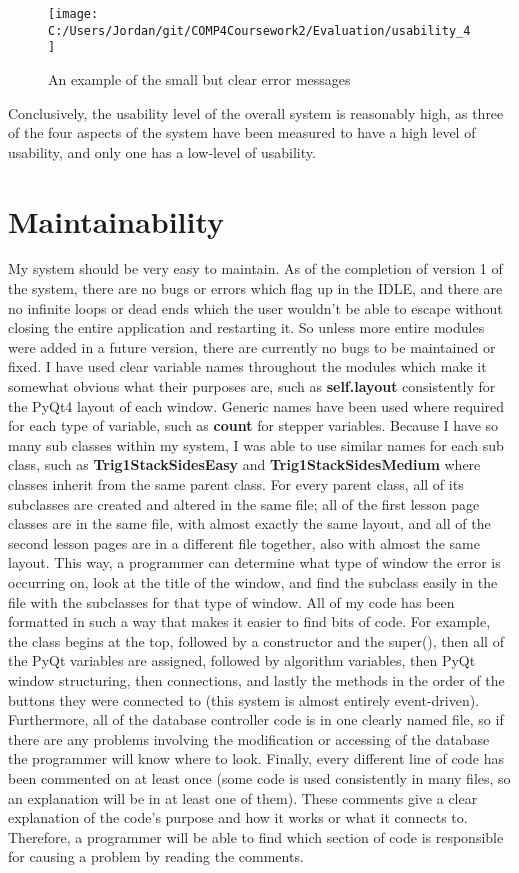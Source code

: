 \begin{figure}[H]
	\texttt{[image: C:/Users/Jordan/git/COMP4Coursework2/Evaluation/usability\_4]}
	\caption{An example of the small but clear error messages}
\end{figure}

Conclusively, the usability level of the overall system is reasonably high, as three of the four aspects of the system have been measured to have a high level of usability, and only one has a low-level of usability.

\section{Maintainability}

My system should be very easy to maintain. As of the completion of version 1 of the system, there are no bugs or errors which flag up in the IDLE, and there are no infinite loops or dead ends which the user wouldn't be able to escape without closing the entire application and restarting it. So unless more entire modules were added in a future version, there are currently no bugs to be maintained or fixed. I have used clear variable names throughout the modules which make it somewhat obvious what their purposes are, such as \textbf{self.layout} consistently for the PyQt4 layout of each window. Generic names have been used where required for each type of variable, such as \textbf{count} for stepper variables. Because I have so many sub classes within my system, I was able to use similar names for each sub class, such as \textbf{Trig1StackSidesEasy} and \textbf{Trig1StackSidesMedium} where classes inherit from the same parent class. For every parent class, all of its subclasses are created and altered in the same file; all of the first lesson page classes are in the same file, with almost exactly the same layout, and all of the second lesson pages are in a different file together, also with almost the same layout. This way, a programmer can determine what type of window the error is occurring on, look at the title of the window, and find the subclass easily in the file with the subclasses for that type of window. All of my code has been formatted in such a way that makes it easier to find bits of code. For example, the class begins at the top, followed by a constructor and the super(), then all of the PyQt variables are assigned, followed by algorithm variables, then PyQt window structuring, then connections, and lastly the methods in the order of the buttons they were connected to (this system is almost entirely event-driven). Furthermore, all of the database controller code is in one clearly named file, so if there are any problems involving the modification or accessing of the database the programmer will know where to look. Finally, every different line of code has been commented on at least once (some code is used consistently in many files, so an explanation will be in at least one of them). These comments give a clear explanation of the code's purpose and how it works or what it connects to. Therefore, a programmer will be able to find which section of code is responsible for causing a problem by reading the comments.

